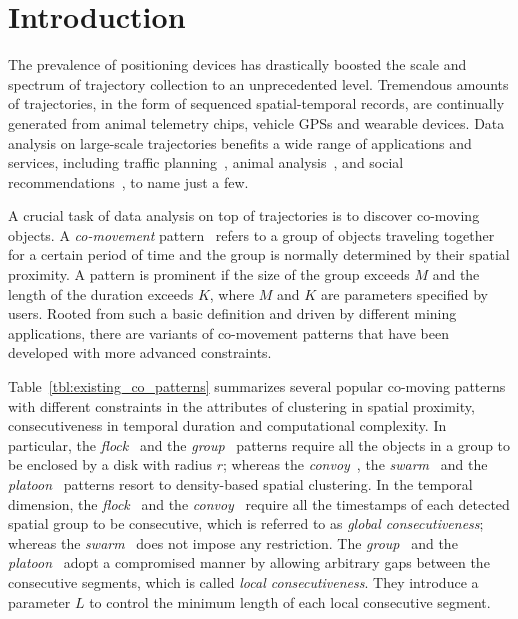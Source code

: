 
\section{Introduction}
The prevalence of positioning devices has drastically boosted 
the scale and spectrum of trajectory collection to an unprecedented level. 
Tremendous amounts of trajectories, in the form of sequenced spatial-temporal 
records, are continually generated from animal telemetry chips, 
vehicle GPSs and wearable devices. Data analysis on large-scale 
trajectories benefits a wide range of applications and services, 
including traffic planning~\cite{zheng2011urban}, animal analysis~\cite{li2010miningperiodic}, and social recommendations~\cite{bao2013survey}, to name just a few.

A crucial task of data analysis on top of trajectories is 
to discover co-moving objects. A \emph{co-movement} pattern~\cite{li2013managing,zheng2015survey} 
refers to a group of objects traveling together for a certain period of time 
and the group is normally determined by their spatial proximity. 
A pattern is prominent if the size of the group exceeds $M$ and the length of the duration exceeds $K$, where $M$ and $K$ are parameters specified by users. Rooted from such a basic definition 
and driven by different mining applications, there are  variants 
of co-movement patterns that have been developed with more advanced constraints.

Table~\ref{tbl:existing_co_patterns} summarizes several popular co-moving patterns 
with different constraints in the attributes of clustering in spatial proximity,
consecutiveness in temporal duration and computational complexity. 
In particular,  the \emph{flock}~\cite{gudmundsson2006flock} 
and the \emph{group}~\cite{wang2006grouppattern} patterns require 
all the objects in a group to be enclosed by a disk with radius $r$; 
whereas the \emph{convoy}~\cite{jeung2008convoy}, the \emph{swarm}~\cite{li2010swarm} 
and the \emph{platoon}~\cite{li2015platoon} patterns resort to density-based 
spatial clustering. 
In the temporal dimension, the \emph{flock}~\cite{gudmundsson2006flock} 
and the \emph{convoy}~\cite{jeung2008convoy} require all the timestamps 
of each detected spatial group to be consecutive, which is referred to as \emph{global consecutiveness}; 
whereas the \emph{swarm}~\cite{li2010swarm} does not impose any restriction. 
The \emph{group}~\cite{wang2006grouppattern} and the \emph{platoon}~\cite{li2015platoon} adopt a compromised manner by allowing
arbitrary gaps between the consecutive segments, which is called \emph{local consecutiveness}. 
They introduce a parameter $L$ to control the minimum length of each local consecutive segment.

